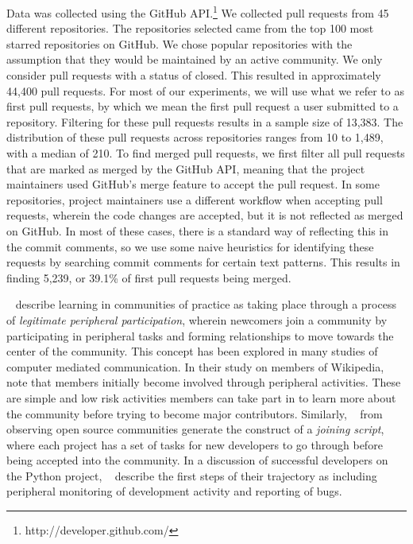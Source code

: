 \documentclass{iitthesis}
\begin{document}
Data was collected using the GitHub API.\footnote{http://developer.github.com/}
We collected pull requests from 45 different repositories. The repositories
selected came from the top 100 most starred repositories on GitHub. We chose
popular repositories with the assumption that they would be maintained by an
active community. We only consider pull requests with a status of closed. This
resulted in approximately 44,400 pull requests. For most of our experiments, we
will use what we refer to as first pull requests, by which we mean the first
pull request a user submitted to a repository. Filtering for these pull requests
results in a sample size of 13,383. The distribution of these pull requests
across repositories ranges from 10 to 1,489, with a median of 210. To find
merged pull requests, we first filter all pull requests that are marked as
merged by the GitHub API, meaning that the project maintainers used GitHub's
merge feature to accept the pull request. In some repositories, project
maintainers use a different workflow when accepting pull requests, wherein the
code changes are accepted, but it is not reflected as merged on GitHub. In most
of these cases, there is a standard way of reflecting this in the commit
comments, so we use some naive heuristics for identifying these requests by
searching commit comments for certain text patterns. This results in finding
5,239, or 39.1\% of first pull requests being merged.


~\cite{lave_situated_1991} describe learning in communities of practice as
taking place through a process of \textit{legitimate peripheral participation},
wherein newcomers join a community by participating in peripheral tasks and
forming relationships to move towards the center of the community. This concept
has been explored in many studies of computer mediated communication.  In their
study on members of Wikipedia, ~\cite{bryant_becoming_2005} note that members
initially become involved through peripheral activities. These are simple and
low risk activities members can take part in to learn more about the community
before trying to become major contributors. Similarly,
~\cite{von_krogh_community_2003} from observing open source communities generate
the construct of a \textit{joining script}, where each project has a set of
tasks for new developers to go through before being accepted into the community.
In a discussion of successful developers on the Python project,
~\cite{ducheneaut_socialization_2005} describe the first steps of their
trajectory as including peripheral monitoring of development activity and
reporting of bugs.
\end{document}
